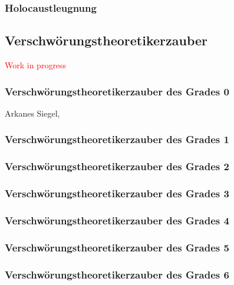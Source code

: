 \documentclass[
	ngerman,
	a4paper,
	11pt,
	twocolumn,
]{scrartcl}
\begin{document}
\subsubsection*{Holocaustleugnung}

\subsection*{Verschwörungstheoretikerzauber}

\textcolor{red}{Work in progress}

\subsubsection*{Verschwörungstheoretikerzauber des Grades 0}

Arkanes Siegel, 

\subsubsection*{Verschwörungstheoretikerzauber des Grades 1}



\subsubsection*{Verschwörungstheoretikerzauber des Grades 2}



\subsubsection*{Verschwörungstheoretikerzauber des Grades 3}



\subsubsection*{Verschwörungstheoretikerzauber des Grades 4}



\subsubsection*{Verschwörungstheoretikerzauber des Grades 5}



\subsubsection*{Verschwörungstheoretikerzauber des Grades 6}
\end{document}
